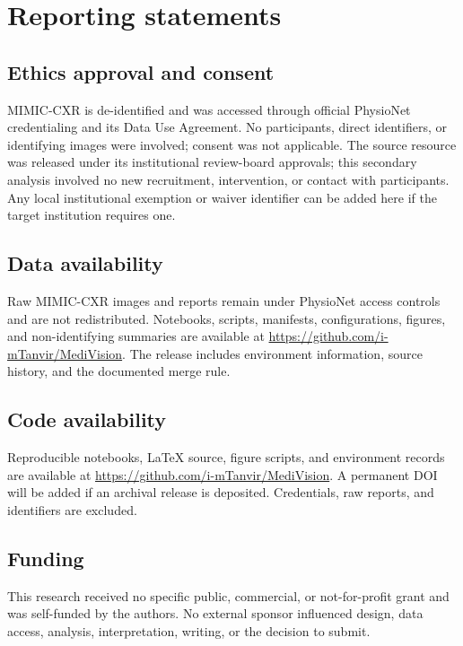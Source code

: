 
\section{Reporting statements}\label{sec:reporting}

\subsection*{Ethics approval and consent}
MIMIC-CXR is de-identified and was accessed through official PhysioNet
credentialing and its Data Use Agreement. No participants, direct identifiers,
or identifying images were involved; consent was not applicable. The source
resource was released under its institutional review-board approvals; this
secondary analysis involved no new recruitment, intervention, or contact with
participants. Any local institutional exemption or waiver identifier can be
added here if the target institution requires one.

\subsection*{Data availability}
Raw MIMIC-CXR images and reports remain under PhysioNet access controls and are
not redistributed. Notebooks, scripts, manifests, configurations, figures, and
non-identifying summaries are available at
\url{https://github.com/i-mTanvir/MediVision}. The release includes environment
information, source history, and the documented merge rule.

\subsection*{Code availability}
Reproducible notebooks, LaTeX source, figure scripts, and environment records
are available at \url{https://github.com/i-mTanvir/MediVision}. A permanent DOI
will be added if an archival release is deposited. Credentials, raw reports,
and identifiers are excluded.

\subsection*{Funding}
This research received no specific public, commercial, or not-for-profit grant
and was self-funded by the authors. No external sponsor influenced design, data
access, analysis, interpretation, writing, or the decision to submit.


